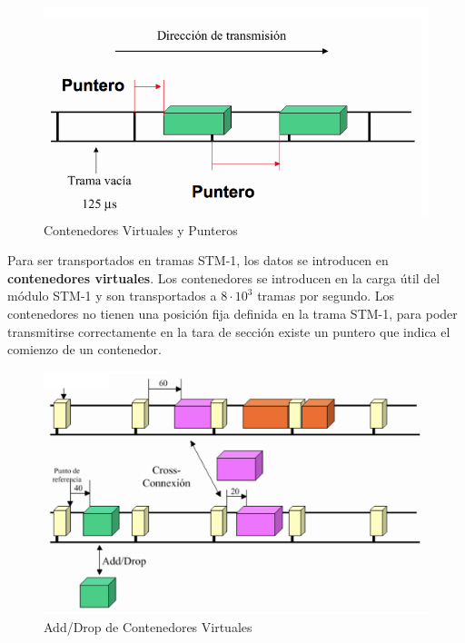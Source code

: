 \documentclass[10pt,portrait, twocolumn]{article}
\begin{document}
		\begin{figure}[!ht]
 		\centering
  		 \includegraphics[scale = 0.4]{images/VC}
		\caption{Contenedores Virtuales y Punteros}
	\end{figure}
	
	
Para ser transportados en tramas STM-1, los datos se introducen en \textbf{contenedores virtuales}. Los contenedores se introducen en la carga útil del módulo STM-1 y son transportados a $8 \cdot 10^{3}$ tramas por segundo. Los contenedores no tienen una posición fija definida en la trama STM-1, para poder transmitirse correctamente en la tara de sección existe un puntero que indica el comienzo de un contenedor.
	
	\begin{figure}[!ht]
 		\centering
  		 \includegraphics[scale = 0.4]{images/VCPointer}
		\caption{Add/Drop de Contenedores Virtuales}
	\end{figure}
	
\end{document}

